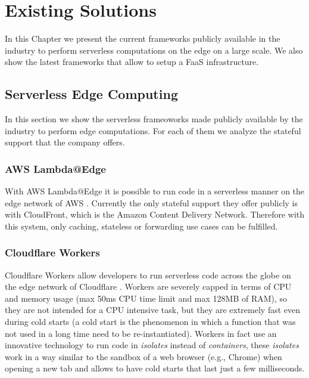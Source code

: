 \chapter{Existing Solutions}
\label{ch:existing-solutions}

In this Chapter we present the current frameworks publicly available in the industry to perform serverless computations on the edge on a large scale. We also show the latest frameworks that allow to setup a FaaS infrastructure.



\section{Serverless Edge Computing}

In this section we show the serverless frameoworks made publicly available by the industry to perform edge computations. For each of them we analyze the stateful support that the company offers.


\subsection{AWS Lambda@Edge}
With AWS Lambda@Edge it is possible to run code in a serverless manner on the edge network of AWS \cite{aws-lambda-at-edge}. Currently the only stateful support they offer publicly is with CloudFront, which is the Amazon Content Delivery Network. Therefore with this system, only caching, stateless or forwarding use cases can be fulfilled.


\subsection{Cloudflare Workers}
Cloudflare Workers allow developers to run serverless code across the globe on the edge network of Cloudflare \cite{cloudflare-workers}. Workers are severely capped in terms of CPU and memory usage (max 50ms CPU time limit and max 128MB of RAM), so they are not intended for a CPU intensive task, but they are extremely fast even during cold starts (a cold start is the phenomenon in which a function that was not used in a long time need to be re-instantiated). Workers in fact use an innovative technology to run code in \textit{isolates} instead of \textit{containers}, these \textit{isolates} work in a way similar to the sandbox of a web browser (e.g., Chrome) when opening a new tab and allows to have cold starts that last just a few milliseconds.

